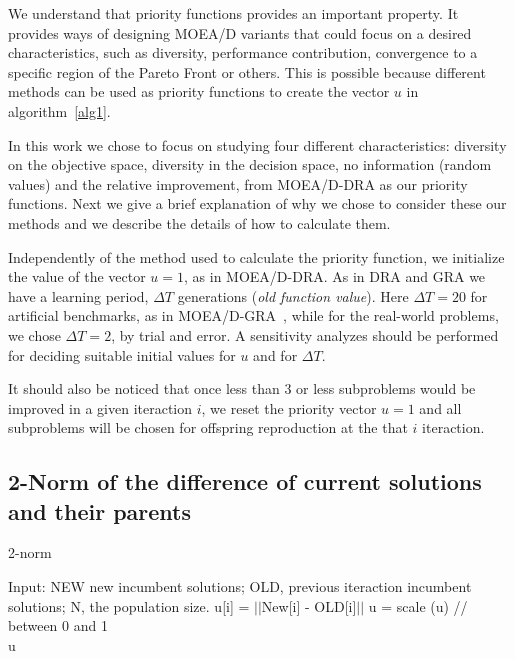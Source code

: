 
We understand that priority functions provides an important property. It provides ways of designing MOEA/D variants that could focus on a desired characteristics, such as diversity, performance contribution, convergence to a specific region of the Pareto Front or others. This is possible because different methods can be used as priority functions to create the vector $u$ in algorithm~\ref{alg1}. 

In this work we chose to focus on studying four different characteristics: diversity on the objective space, diversity in the decision space, no information (random values) and the relative improvement, from MOEA/D-DRA as our priority functions. Next we give a brief explanation of why we chose to consider these  our methods and we describe the details of how to calculate them.

Independently of the method used to calculate the priority function, we initialize the value of the vector $u=1$, as in MOEA/D-DRA. As in DRA and GRA we have a learning period, $\Delta T$ generations (\textit{old function value}). Here $\Delta T=20$ for artificial benchmarks, as in MOEA/D-GRA~\cite{zhou2016all}, while for the real-world problems, we chose $\Delta T=2$, by trial and error. A sensitivity analyzes should be performed for deciding suitable initial values for $u$ and for $\Delta T$.

 It should also be noticed that once less than $3$ or less subproblems would be improved in a given iteraction $i$, we reset the priority vector $u = 1$  and all subproblems will be chosen for offspring reproduction at the that $i$ iteraction.

\subsection{2-Norm of the difference of current solutions and their parents} 

\begin{algorithm}[t]
	\caption{2-norm}\label{alg3}
	\begin{algorithmic}[1]
		
		\State Input: NEW new incumbent solutions; OLD, previous iteraction incumbent solutions; N, the population size.
			\State u[i] = $||$New[i] - OLD[i]$||$
		\EndFor
		\State u = scale (u) // between 0 and 1\\
	\Return u
	\end{algorithmic}
\end{algorithm}

